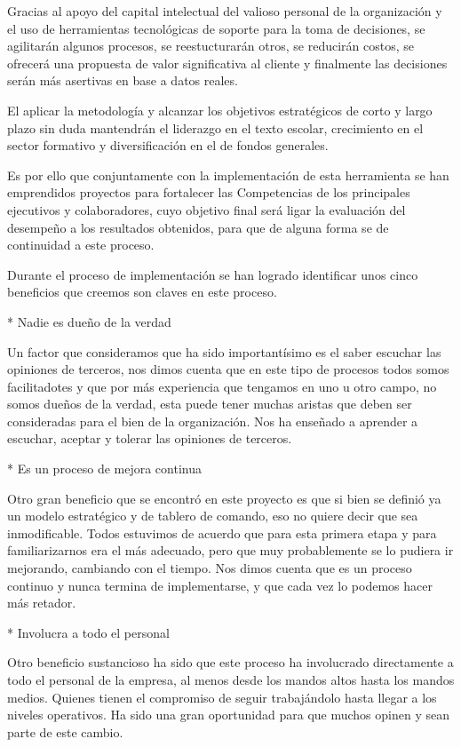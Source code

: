 \item {Gracias al apoyo del capital intelectual del valioso personal de la organización y el uso de herramientas tecnológicas de soporte para la toma de decisiones, se agilitarán algunos procesos, se reestucturarán otros, se reducirán costos, se ofrecerá una propuesta de valor significativa al cliente y finalmente las decisiones serán más asertivas en base a datos reales.

El aplicar la metodología y alcanzar los objetivos estratégicos de corto y largo plazo sin duda mantendrán el liderazgo en el texto escolar, crecimiento en el sector formativo y diversificación en el de fondos generales.

Es por ello que conjuntamente con la implementación de esta herramienta se han emprendidos proyectos para fortalecer las Competencias de los principales  ejecutivos y colaboradores, cuyo objetivo final será ligar la evaluación del desempeño a los resultados obtenidos, para que de alguna forma se de continuidad a este proceso.

Durante el proceso de implementación se han logrado identificar unos cinco beneficios que creemos son claves en este proceso.

* Nadie es dueño de la verdad

Un factor que consideramos que ha sido importantísimo es el saber escuchar las opiniones de terceros, nos dimos cuenta que en este tipo de procesos todos somos facilitadotes y que por más experiencia que tengamos en uno u otro campo, no somos dueños de la verdad, esta puede tener muchas aristas que deben ser consideradas para el bien de la organización. Nos ha enseñado a aprender a escuchar, aceptar y tolerar las opiniones de terceros.

* Es un proceso de mejora continua

Otro gran beneficio que se encontró en este proyecto es que si bien se definió ya un modelo estratégico y de tablero de comando, eso no quiere decir que sea inmodificable.  Todos estuvimos de acuerdo que para esta primera etapa y para familiarizarnos era el más adecuado, pero que muy probablemente se lo pudiera ir mejorando, cambiando con el tiempo. Nos dimos cuenta que es un proceso continuo y nunca termina de implementarse, y que cada vez lo podemos hacer más retador.

* Involucra a todo el personal

Otro beneficio sustancioso ha sido que este proceso ha involucrado directamente a todo el personal de la empresa, al menos desde los mandos altos hasta los mandos medios. Quienes tienen el compromiso de seguir trabajándolo hasta llegar a los niveles operativos. Ha sido una gran oportunidad para que muchos opinen y sean parte de este cambio.

}
